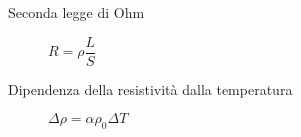 \documentclass[a4paper,11pt,italian]{article}
\begin{document}
\begin{description}
%   
  
  \item[Seconda legge di Ohm] 
  $ R = \rho \dfrac{L}{S} $
  
  \item[Dipendenza della resistività dalla temperatura]
  $ \Delta \rho = \alpha \rho_0 \Delta T  $
  
  
%   
  

\end{description}
\end{document}
